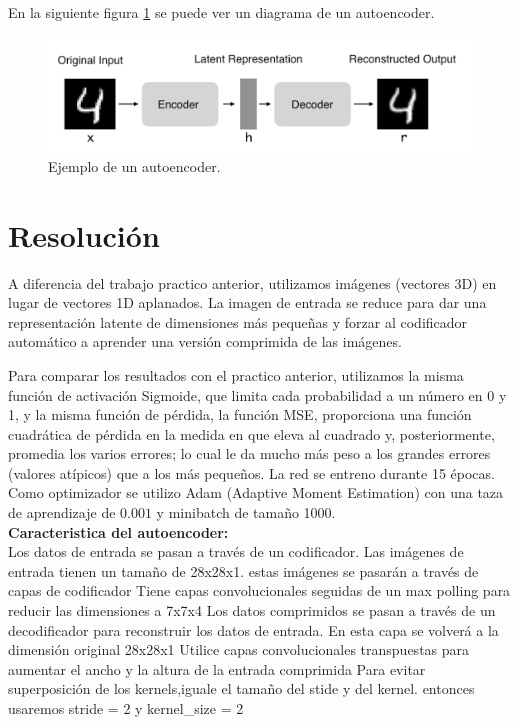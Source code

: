 \documentclass{article}
\begin{document}
En la siguiente figura \ref{fig2} se puede ver un diagrama de un autoencoder.

\begin{figure}[H]
\centering
\includegraphics[width=\textwidth]{estructura.png}
\caption{Ejemplo de un autoencoder.}
\label{fig2}
\end{figure}


\section*{Resolución}

A diferencia del trabajo practico anterior, utilizamos imágenes (vectores 3D) en lugar de vectores 1D aplanados. La imagen de entrada se reduce para dar una representación latente de dimensiones más pequeñas y forzar al codificador automático a aprender una versión comprimida de las imágenes.

Para comparar los resultados con el practico anterior, utilizamos la misma función de activación Sigmoide, que limita cada probabilidad a un número en 0 y 1, y la misma función de pérdida, la función MSE, proporciona una función cuadrática de pérdida en la medida en que eleva al cuadrado y, posteriormente, promedia los varios errores; lo cual le da mucho más peso a los grandes errores (valores atípicos) que a los más pequeños.
La red se entreno durante 15 épocas. Como optimizador se utilizo Adam (Adaptive Moment Estimation) con una taza de aprendizaje de $0.001$ y minibatch de tamaño 1000.
\\

\textbf{ Caracteristica del autoencoder:} \\

Los datos de entrada se pasan a través de un codificador. Las imágenes de entrada tienen un tamaño de 28x28x1. estas imágenes se pasarán a través de capas de codificador
Tiene capas convolucionales seguidas de un max polling para reducir las dimensiones a 7x7x4
Los datos comprimidos se pasan a través de un decodificador para reconstruir los datos de entrada. En esta capa se volverá a la dimensión original 28x28x1
Utilice capas convolucionales transpuestas para aumentar el ancho y la altura de la entrada comprimida
Para evitar superposición de los kernels,iguale el tamaño del stide y del kernel. entonces usaremos stride = 2 y kernel_size = 2
\end{document}
